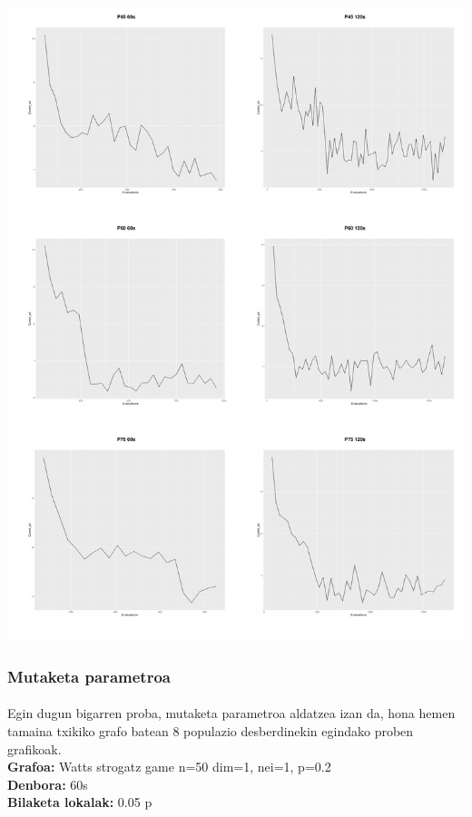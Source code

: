 \documentclass[eu,gi]{ifirak}\usepackage[]{graphicx}\usepackage[]{color}
\makeatletter
\def\maxwidth{ %
  \ifdim\Gin@nat@width>\linewidth
    \linewidth
  \else
    \Gin@nat@width
  \fi
}
\newenvironment{knitrout}{}{} %
\makeatother
\begin{document}
\begin{center}	
\begin{knitrout}
\color{fgcolor}
\includegraphics[width=\maxwidth]{figure/unnamed-chunk-20-1} 

\end{knitrout}
\end{center}

\pagebreak

\pagebreak
\subsubsection{Mutaketa parametroa}
\paragraph{}
Egin dugun bigarren proba, mutaketa parametroa aldatzea izan da, hona hemen tamaina txikiko grafo batean 8 populazio desberdinekin egindako proben grafikoak.\\
\hspace*{1.2cm}\textbf{Grafoa:} Watts strogatz game n=50 dim=1, nei=1, p=0.2\\
\hspace*{1.2cm}\textbf{Denbora:} 60s\\
\hspace*{1.2cm}\textbf{Bilaketa lokalak:} 0.05 p\\
\end{document}
